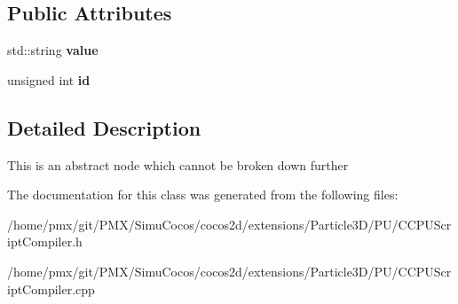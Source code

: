 \subsection*{Public Attributes}
\begin{DoxyCompactItemize}
\item 
\mbox{\label{classPUAtomAbstractNode_a374ad5ceee5ae82373c2572471167b49}} 
std\+::string {\bfseries value}
\item 
\mbox{\label{classPUAtomAbstractNode_ae0b8fe40894ef243732b49390d50c0ab}} 
unsigned int {\bfseries id}
\end{DoxyCompactItemize}


\subsection{Detailed Description}
This is an abstract node which cannot be broken down further 

The documentation for this class was generated from the following files\+:\begin{DoxyCompactItemize}
\item 
/home/pmx/git/\+P\+M\+X/\+Simu\+Cocos/cocos2d/extensions/\+Particle3\+D/\+P\+U/C\+C\+P\+U\+Script\+Compiler.\+h\item 
/home/pmx/git/\+P\+M\+X/\+Simu\+Cocos/cocos2d/extensions/\+Particle3\+D/\+P\+U/C\+C\+P\+U\+Script\+Compiler.\+cpp\end{DoxyCompactItemize}
